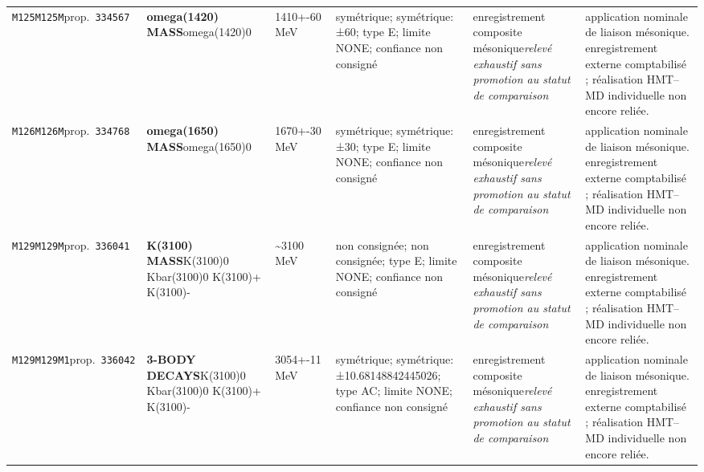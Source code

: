 \begin{landscape}
\begin{longtable}{L{1.85cm}L{4.45cm}L{2.35cm}L{4.05cm}L{3.35cm}L{7.15cm}}
\texttt{M125}\newline \texttt{M125M}\newline prop.\ \texttt{334567} & \textbf{omega(1420) MASS}\newline omega(1420)0 & 1410+-60\,MeV & symétrique; symétrique: ±60; type E; limite NONE; confiance non consigné & enregistrement composite mésonique\newline \emph{relevé exhaustif sans promotion au statut de comparaison} & application nominale de liaison mésonique. enregistrement externe comptabilisé ; réalisation HMT--MD individuelle non encore reliée. \\
\texttt{M126}\newline \texttt{M126M}\newline prop.\ \texttt{334768} & \textbf{omega(1650) MASS}\newline omega(1650)0 & 1670+-30\,MeV & symétrique; symétrique: ±30; type E; limite NONE; confiance non consigné & enregistrement composite mésonique\newline \emph{relevé exhaustif sans promotion au statut de comparaison} & application nominale de liaison mésonique. enregistrement externe comptabilisé ; réalisation HMT--MD individuelle non encore reliée. \\
\texttt{M129}\newline \texttt{M129M}\newline prop.\ \texttt{336041} & \textbf{K(3100) MASS}\newline K(3100)0 \textbar{}\allowbreak{} Kbar(3100)0 \textbar{}\allowbreak{} K(3100)+ \textbar{}\allowbreak{} K(3100)- & \textasciitilde{}3100\,MeV & non consignée; non consignée; type E; limite NONE; confiance non consigné & enregistrement composite mésonique\newline \emph{relevé exhaustif sans promotion au statut de comparaison} & application nominale de liaison mésonique. enregistrement externe comptabilisé ; réalisation HMT--MD individuelle non encore reliée. \\
\texttt{M129}\newline \texttt{M129M1}\newline prop.\ \texttt{336042} & \textbf{3-BODY DECAYS}\newline K(3100)0 \textbar{}\allowbreak{} Kbar(3100)0 \textbar{}\allowbreak{} K(3100)+ \textbar{}\allowbreak{} K(3100)- & 3054+-11\,MeV & symétrique; symétrique: ±10.68148842445026; type AC; limite NONE; confiance non consigné & enregistrement composite mésonique\newline \emph{relevé exhaustif sans promotion au statut de comparaison} & application nominale de liaison mésonique. enregistrement externe comptabilisé ; réalisation HMT--MD individuelle non encore reliée. \\

\end{longtable}
\end{landscape}
